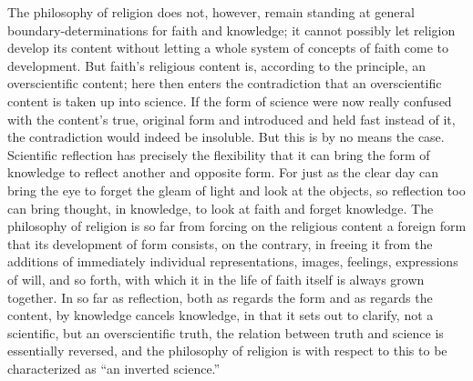 \documentclass[12pt]{book}
\begin{document}
The philosophy of religion does not, however, remain standing at general boundary-determinations
for faith and knowledge; it cannot possibly let religion develop its content without letting a
whole system of concepts of faith come to development. But faith's religious content is, according
to the principle, an overscientific content; here then enters the contradiction that an
overscientific content is taken up into science. If the form of science were now really confused
with the content's true, original form and introduced and held fast instead of it, the
contradiction would indeed be insoluble. But this is by no means the case. Scientific reflection
has precisely the flexibility that it can bring the form of knowledge to reflect another and
opposite form. For just as the clear day can bring the eye to forget the gleam of light and look
at the objects, so reflection too can bring thought, in knowledge, to look at faith and forget
knowledge. The philosophy of religion is so far from forcing on the religious content a foreign
form that its development of form consists, on the contrary, in freeing it from the additions of
immediately individual representations, images, feelings, expressions of will, and so forth, with
which it in the life of faith itself is always grown together. In so far as reflection, both as
regards the form and as regards the content, by knowledge cancels knowledge, in that it sets out
to clarify, not a scientific, but an overscientific truth, the relation between truth and science
is essentially reversed, and the philosophy of religion is with respect to this to be
characterized as ``an inverted science.''
\end{document}
